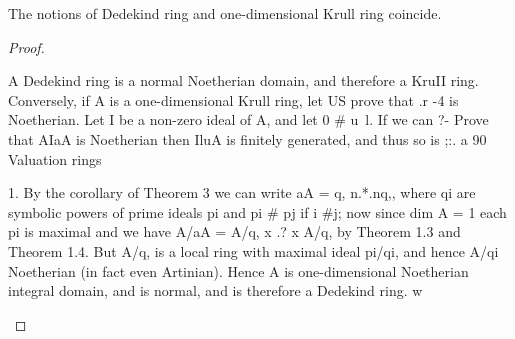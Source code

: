 \begin{theorem}[Theorem 12.5]\label{mcrt-auto-theorem-12-5}
\begin{mathematicalrecord}
The notions of Dedekind ring and one-dimensional Krull
    ring coincide.
\end{mathematicalrecord}
\end{theorem}
\begin{proof}
\begin{mathematicalrecord}
A Dedekind ring is a normal Noetherian domain, and therefore a
    KruII ring. Conversely, if A is a one-dimensional Krull ring, let US prove that
.r -4 is Noetherian. Let I be a non-zero ideal of A, and let 0 # u~l. If we can
?- Prove that AIaA is Noetherian then IluA is finitely generated, and thus so is
;:.
a
90       Valuation rings

1. By the corollary of Theorem 3 we can write aA = q, n.*.nq,,    where
qi are symbolic powers of prime ideals pi and pi # pj if i #j; now since
dim A = 1 each pi is maximal and we have
         A/aA = A/q, x .? x A/q,
by Theorem 1.3 and Theorem 1.4. But A/q, is a local ring with maximal
ideal pi/qi, and hence A/qi %
Noetherian (in fact even Artinian). Hence A is one-dimensional Noetherian
integral domain, and is normal, and is therefore a Dedekind ring. w
\end{mathematicalrecord}
\end{proof}


